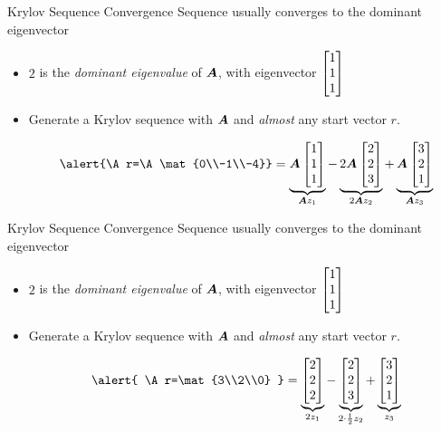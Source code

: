 \documentclass{beamer}
\begin{document}
\begin{frame}{Krylov Sequence Convergence}
Sequence usually converges to the dominant eigenvector
\bigskip 

\begin{itemize}
	\item $2$ is the \emph{dominant eigenvalue} of $\bm{A}$, with eigenvector
	$\begin{bmatrix} 1\\1\\1\end{bmatrix}$

\medskip
\item Generate a Krylov sequence with $\bm{A}$ and \emph{almost} any start vector $r$.

\[ 
\alert{\A r=\A \mat{0\\-1\\-4}} = \underbrace{\A \mat{1\\1\\1}}_{\A z_1} 
- \underbrace{2\A \mat{2\\2\\3}}_{2\A z_2} + \underbrace{\A \mat{3\\2\\1}}_{\A z_3}
\]
\end{itemize}
\end{frame}




\begin{frame}{Krylov Sequence Convergence}
Sequence usually converges to the dominant eigenvector
\bigskip 

\begin{itemize}
	\item $2$ is the \emph{dominant eigenvalue} of $\bm{A}$, with eigenvector
	$\begin{bmatrix} 1\\1\\1\end{bmatrix}$

\medskip
\item Generate a Krylov sequence with $\bm{A}$ and \emph{almost} any start vector $r$.

\[ 
\alert{ \A r=\mat{3\\2\\0} } = \underbrace{\mat{2\\2\\2}}_{2z_1} 
 - \underbrace{\mat{2\\2\\3}}_{2\cdot \frac{1}{2}z_2} + \underbrace{\mat{3\\2\\1}}_{z_3}
\]
\end{itemize}
\end{frame}
\end{document}
